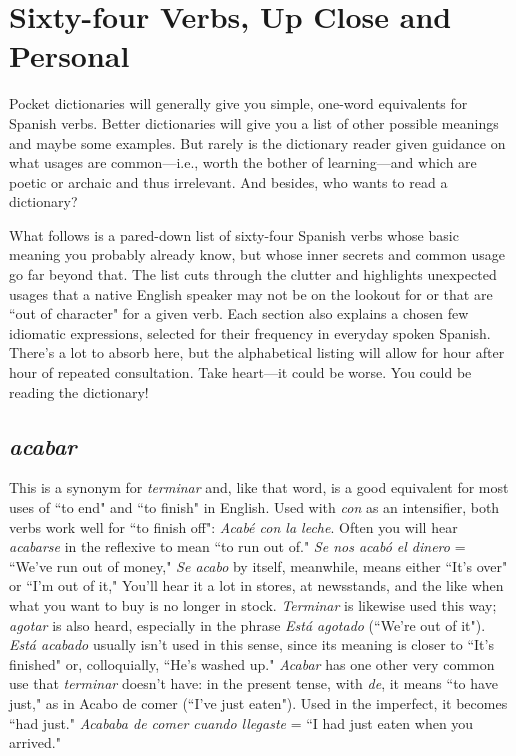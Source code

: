 \chapter{Sixty-four Verbs, Up Close and Personal}

Pocket dictionaries will generally give you simple, one-word
equivalents for Spanish verbs. Better dictionaries will give you a list of
other possible meanings and maybe some examples. But rarely is the
dictionary reader given guidance on what usages are common---i.e.,
worth the bother of learning---and which are poetic or archaic and thus
irrelevant. And besides, who wants to read a dictionary?

What follows is a pared-down list of sixty-four Spanish verbs
whose basic meaning you probably already know, but whose inner secrets and common usage go far beyond that. The list cuts through the
clutter and highlights unexpected usages that a native English speaker
may not be on the lookout for or that are ``out of character" for a given
verb. Each section also explains a chosen few idiomatic expressions,
selected for their frequency in everyday spoken Spanish. There's a lot
to absorb here, but the alphabetical listing will allow for hour after
hour of repeated consultation. Take heart---it could be worse. You
could be reading the dictionary!

\section{\emph{acabar}}

This is a synonym for \emph{terminar} and, like that word, is a good
equivalent for most uses of ``to end" and ``to finish" in English. Used
with \emph{con} as an intensifier, both verbs work well for ``to finish off":
\emph{Acabé con la leche}. Often you will hear \emph{acabarse} in the reflexive to
mean ``to run out of." \emph{Se nos acabó el dinero} = ``We've run out of
money," \emph{Se acabo} by itself, meanwhile, means either ``It's over" or
``I'm out of it," You'll hear it a lot in stores, at newsstands, and the like
when what you want to buy is no longer in stock. \emph{Terminar} is likewise
used this way; \emph{agotar} is also heard, especially in the phrase \emph{Está agotado} (``We're out of it"). \emph{Está acabado} usually isn't used in this sense,
since its meaning is closer to ``It's finished" or, colloquially, ``He's
washed up." \emph{Acabar} has one other very common use that \emph{terminar}
doesn't have: in the present tense, with \emph{de}, it means ``to have just,"
as in Acabo de comer (``I've just eaten"). Used in the imperfect, it becomes ``had just." \emph{Acababa de comer cuando llegaste} = ``I had just
eaten when you arrived."

